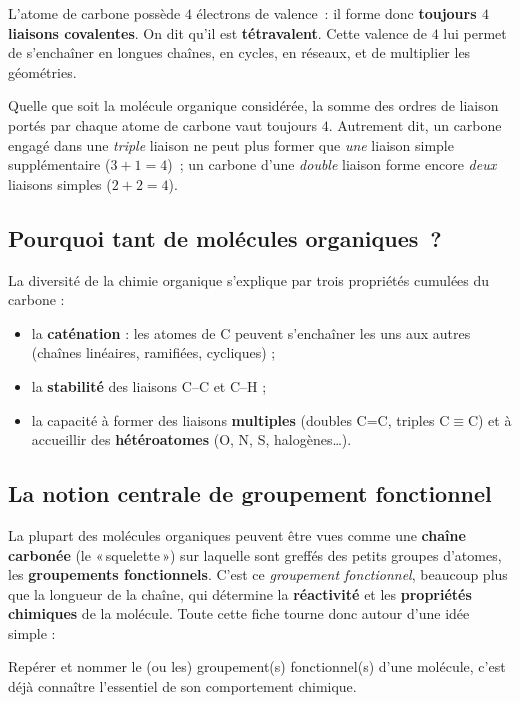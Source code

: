 \documentclass[11pt,a4paper]{article}
\begin{document}
\begin{definition}
L'atome de carbone possède $4$ électrons de valence~: il forme donc \textbf{toujours $4$ liaisons covalentes}. On dit qu'il est \textbf{tétravalent}. Cette valence de $4$ lui permet de s'enchaîner en longues chaînes, en cycles, en réseaux, et de multiplier les géométries.
\end{definition}

\begin{theoreme}
Quelle que soit la molécule organique considérée, la somme des ordres de liaison portés par chaque atome de carbone vaut toujours $4$. Autrement dit, un carbone engagé dans une \emph{triple} liaison ne peut plus former que \emph{une} liaison simple supplémentaire ($3+1=4$)~; un carbone d'une \emph{double} liaison forme encore \emph{deux} liaisons simples ($2+2=4$).
\end{theoreme}

\subsection{Pourquoi tant de molécules organiques~?}
La diversité de la chimie organique s'explique par trois propriétés cumulées du carbone :
\begin{itemize}[leftmargin=1.6em,itemsep=2pt]
  \item la \textbf{caténation} : les atomes de C peuvent s'enchaîner les uns aux autres (chaînes linéaires, ramifiées, cycliques) ;
  \item la \textbf{stabilité} des liaisons C--C et C--H ;
  \item la capacité à former des liaisons \textbf{multiples} (doubles C=C, triples C$\equiv$C) et à accueillir des \textbf{hétéroatomes} (O, N, S, halogènes\dots).
\end{itemize}

\subsection{La notion centrale de groupement fonctionnel}
La plupart des molécules organiques peuvent être vues comme une \textbf{chaîne carbonée} (le «\,squelette\,») sur laquelle sont greffés des petits groupes d'atomes, les \textbf{groupements fonctionnels}. C'est ce \emph{groupement fonctionnel}, beaucoup plus que la longueur de la chaîne, qui détermine la \textbf{réactivité} et les \textbf{propriétés chimiques} de la molécule. Toute cette fiche tourne donc autour d'une idée simple :
\begin{regle}
Repérer et nommer le (ou les) groupement(s) fonctionnel(s) d'une molécule, c'est déjà connaître l'essentiel de son comportement chimique.
\end{regle}
\end{document}
